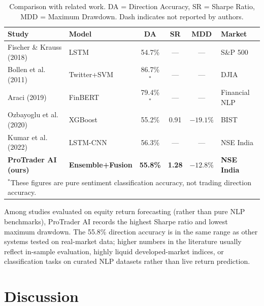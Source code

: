 \documentclass[10pt,a4paper,twoside]{article}
\begin{document}
\begin{table}[htb]
  \begin{center}
    {\caption{Comparison with related work. DA = Direction Accuracy, SR = Sharpe
    Ratio, MDD = Maximum Drawdown. Dash indicates not reported by
    authors.}\label{tab:comparison}}
    \begin{tabular}{|l|l|c|c|c|l|}
    \hline
    \textbf{Study} & \textbf{Model} & \textbf{DA} & \textbf{SR} & \textbf{MDD} & \textbf{Market} \\
    \hline
    Fischer \& Krauss (2018)~\cite{fischer2018} & LSTM & 54.7\% & --- & --- & S\&P 500 \\
    Bollen et al. (2011)~\cite{bollen2011} & Twitter+SVM & 86.7\%$^*$ & --- & --- & DJIA \\
    Araci (2019)~\cite{araci2019} & FinBERT & 79.4\%$^*$ & --- & --- & Financial NLP \\
    Ozbayoglu et al. (2020)~\cite{ozbayoglu2020} & XGBoost & 55.2\% & 0.91 & $-19.1\%$ & BIST \\
    Kumar et al. (2022)~\cite{kumar2022} & LSTM-CNN & 56.3\% & --- & --- & NSE India \\
    \textbf{ProTrader AI (ours)} & \textbf{Ensemble+Fusion} & \textbf{55.8\%} & \textbf{1.28} & \textbf{$-12.8\%$} & \textbf{NSE India} \\
    \hline
    \multicolumn{6}{l}{$^*$These figures are pure sentiment classification accuracy, not trading direction accuracy.} \\
    \hline
    \end{tabular}
  \end{center}
\end{table}

Among studies evaluated on equity return forecasting (rather than pure NLP
benchmarks), ProTrader AI records the highest Sharpe ratio and lowest maximum
drawdown. The 55.8\% direction accuracy is in the same range as other systems
tested on real-market data; higher numbers in the literature usually reflect
in-sample evaluation, highly liquid developed-market indices, or classification
tasks on curated NLP datasets rather than live return prediction.

\section{Discussion}
\end{document}

